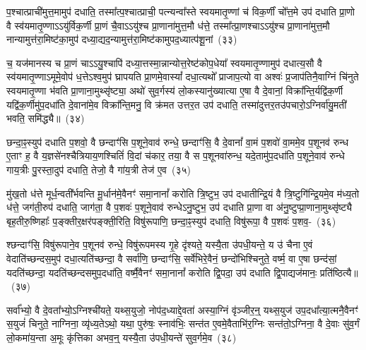 प॒श्चात्प्राची॑मुत्त॒मामुप॑ दधाति॒ तस्मा᳚त्प॒श्चात्प्राची॒ पत्न्यन्वा᳚स्ते स्वयमा\-तृ॒ण्णां च॑ विक॒र्णीं चो᳚त्त॒मे उप॑ दधाति प्रा॒णो वै स्व॑यमातृ॒ण्णा\-ऽऽ\-यु॑र्विक॒र्णी प्रा॒णं चै॒वा\-ऽऽ\-यु॑श्च प्रा॒णाना॑मुत्त॒मौ ध॑त्ते॒ तस्मा᳚त्प्रा॒णश्चा\-ऽऽ\-यु॑श्च प्रा॒णाना॑मुत्त॒मौ नान्यामुत्त॑रा॒मिष्ट॑का॒मुप॑ दध्या॒द्यद॒न्यामुत्त॑रा॒मिष्ट॑कामुपद॒ध्यात्प॑शू॒नां~(३३)\ip

च॒ यज॑मानस्य च प्रा॒णं चा\-ऽऽ\-यु॒श्चापि॑ दध्या॒त्तस्मा॒न्नान्योत्त॒रेष्ट॑कोप॒धेया᳚ स्वयमा\-तृ॒ण्णामुप॑ दधात्य॒सौ वै स्व॑यमातृ॒ण्णा\-ऽ\-मूमे॒वोप॑ ध॒त्ते\-ऽश्व॒मुप॑ घ्रापयति प्रा॒णमे॒वास्यां᳚ दधा॒त्यथो᳚ प्राजाप॒त्यो वा अश्वः॑ प्र॒जा\-प॑तिनै॒वाग्निं चि॑नुते स्वयमा\-तृ॒ण्णा भ॑वति प्रा॒णाना॒मुथ्सृ॑ष्ट्या॒ अथो॑ सुव॒र्गस्य॑ लो॒कस्यानु॑ख्यात्या ए॒षा वै दे॒वानां॒ विक्रा᳚न्ति॒र्यद्वि॑क॒र्णी यद्वि॑क॒र्णीमु॑प॒\-दधा॑ति दे॒वाना॑मे॒व विक्रा᳚न्ति॒मनु॒ वि क्र॑मत उत्तर॒त उप॑ दधाति॒ तस्मा॑दुत्तर॒तउ॑पचारो॒\-ऽग्निर्वा॑यु॒मती॑ भवति॒ समि॑द्ध्यै॥~(३४)\ip

{\anuvakamend[{सम्भृ॑तं॒ यन्ना॑क॒सदो॒ यन्ना॑क॒सद॒स्तत्प॑शू॒नामे॒षां वै द्वाविꣳ॑शतिश्च}]}

छन्दा॒ꣴ॒स्युप॑ दधाति प॒शवो॒ वै छन्दाꣳ॑सि प॒शूने॒वाव॑ रुन्धे॒ छन्दाꣳ॑सि॒ वै दे॒वानां᳚ वा॒मं प॒शवो॑ वा॒ममे॒व प॒शूनव॑ रुन्ध ए॒ताꣳ ह॒ वै य॒ज्ञसे॑नश्चैत्रियाय॒णश्चितिं॑ वि॒दां च॑कार॒ तया॒ वै स प॒शूनवा॑रुन्ध॒ यदे॒तामु॑प॒\-दधा॑ति प॒शूने॒वाव॑ रुन्धे गाय॒त्रीः पु॒रस्ता॒दुप॑ दधाति॒ तेजो॒ वै गा॑य॒त्री तेज॑ ए॒व~(३५)\ip

मु॑ख॒तो ध॑त्ते मूर्ध॒न्वती᳚र्भवन्ति मू॒र्धान॑मे॒वैनꣳ॑ समा॒नानां᳚ करोति त्रि॒ष्टुभ॒ उप॑ दधातीन्द्रि॒यं वै त्रि॒ष्टुगि॑न्द्रि॒यमे॒व म॑ध्य॒तो ध॑त्ते॒ जग॑ती॒रुप॑ दधाति॒ जाग॑ता॒ वै प॒शवः॑ प॒शूने॒वाव॑ रुन्धे\-ऽनु॒ष्टुभ॒ उप॑ दधाति प्रा॒णा वा अ॑नु॒ष्टुप्प्रा॒णाना॒मुथ्सृ॑ष्ट्यै बृह॒तीरु॒ष्णिहाः᳚ प॒ङ्क्तीर॒क्षर॑पङ्क्ती॒रिति॒ विषु॑रूपाणि॒ छन्दा॒ꣴ॒स्युप॑ दधाति॒ विषु॑रूपा॒ वै प॒शवः॑ प॒शव॒-~(३६)\ip

श्छन्दाꣳ॑सि॒ विषु॑रूपाने॒व प॒शूनव॑ रुन्धे॒ विषु॑रूपमस्य गृ॒हे दृ॑श्यते॒ यस्यै॒ता उ॑पधी॒यन्ते॒ य उ॑ चैना ए॒वं वेदाति॑च्छन्दस॒मुप॑ दधा॒त्यति॑च्छन्दा॒ वै सर्वा॑णि॒ छन्दाꣳ॑सि॒ सर्वे॑भिरे॒वैनं॒ छन्दो॑भिश्चिनुते॒ वर्ष्म॒ वा ए॒षा छन्द॑सां॒ यदति॑च्छन्दा॒ यदति॑च्छन्दसमुप॒\-दधा॑ति॒ वर्ष्मै॒वैनꣳ॑ समा॒नानां᳚ करोति द्वि॒पदा॒ उप॑ दधाति द्वि॒पाद्यज॑मानः॒ प्रति॑ष्ठित्यै॥~(३७)\ip

{\anuvakamend[{तेज॑ ए॒व प॒शवः॑ प॒शवो॒ यज॑मान॒ एक॑ञ्च}]}

सर्वा᳚भ्यो॒ वै दे॒वता᳚भ्यो॒\-ऽग्निश्ची॑यते॒ यथ्स॒युजो॒ नोप॑द॒ध्याद्दे॒वता॑ अस्या॒ग्निं वृ॑ञ्जीर॒न्॒ यथ्स॒युज॑ उप॒दधा᳚त्या॒त्मनै॒वैनꣳ॑ स॒युजं॑ चिनुते॒ नाग्निना॒ व्यृ॑ध्य॒ते\-ऽथो॒ यथा॒ पुरु॑षः॒ स्नाव॑भिः॒ सन्त॑त ए॒वमे॒वैताभि॑र॒ग्निः सन्त॑तो॒\-ऽग्निना॒ वै दे॒वाः सु॑व॒र्गं लो॒कमा॑य॒न्ता अ॒मूः कृ॑त्तिका अभव॒न्॒ यस्यै॒ता उ॑पधी॒यन्ते॑ सुव॒र्गमे॒व~(३८)\ip

